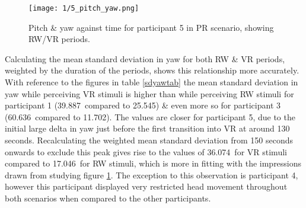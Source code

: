 \begin{figure}[h]
	\begin{center}
	\texttt{[image: 1/5\_pitch\_yaw.png]}
	\caption{Pitch \& yaw against time for participant 5 in PR scenario, showing RW/VR periods.}
	\label{5_pitch_yaw.png}
	\end{center}
\end{figure}

Calculating the mean standard deviation in yaw for both RW \& VR periods, weighted by the duration of the periods, shows this relationship more accurately. With reference to the figures in table \ref{sdyawtab} the mean standard deviation in yaw while perceiving VR stimuli is higher than while perceiving RW stimuli for participant 1 (39.887\textdegree\ compared to 25.545\textdegree) \& even more so for participant 3 (60.636\textdegree\ compared to 11.702\textdegree). The values are closer for participant 5, due to the initial large delta in yaw just before the first transition into VR at around 130 seconds. Recalculating the weighted mean standard deviation from 150 seconds onwards to exclude this peak gives rise to the values of 36.074\textdegree\ for VR stimuli compared to 17.046\textdegree\ for RW stimuli, which is more in fitting with the impressions drawn from studying figure \ref{5_pitch_yaw.png}. The exception to this observation is participant 4, however this participant displayed very restricted head movement throughout both scenarios when compared to the other participants.

